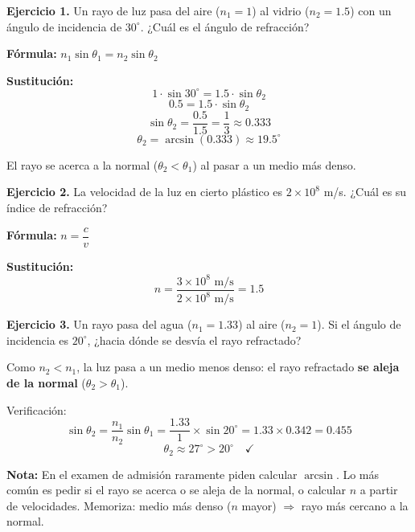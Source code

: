\begin{seccion}

\textbf{Ejercicio 1.} Un rayo de luz pasa del aire ($n_1 = 1$) al vidrio ($n_2 = 1.5$) con un ángulo de incidencia de $30^\circ$. ¿Cuál es el ángulo de refracción?

\begin{ecuacion}
\textbf{Fórmula:} $n_1 \sin\theta_1 = n_2 \sin\theta_2$

\textbf{Sustitución:}
$$1 \cdot \sin 30^\circ = 1.5 \cdot \sin\theta_2$$
$$0.5 = 1.5 \cdot \sin\theta_2$$
$$\sin\theta_2 = \frac{0.5}{1.5} = \frac{1}{3} \approx 0.333$$
$$\theta_2 = \arcsin(0.333) \approx 19.5^\circ$$

El rayo se acerca a la normal ($\theta_2 < \theta_1$) al pasar a un medio más denso.
\end{ecuacion}

\vspace{0.4cm}

\textbf{Ejercicio 2.} La velocidad de la luz en cierto plástico es $2 \times 10^8$ m/s. ¿Cuál es su índice de refracción?

\begin{ecuacion}
\textbf{Fórmula:} $n = \dfrac{c}{v}$

\textbf{Sustitución:}
$$n = \frac{3 \times 10^8 \text{ m/s}}{2 \times 10^8 \text{ m/s}} = 1.5$$
\end{ecuacion}

\vspace{0.4cm}

\textbf{Ejercicio 3.} Un rayo pasa del agua ($n_1 = 1.33$) al aire ($n_2 = 1$). Si el ángulo de incidencia es $20^\circ$, ¿hacia dónde se desvía el rayo refractado?

\begin{ecuacion}
Como $n_2 < n_1$, la luz pasa a un medio menos denso: el rayo refractado \textbf{se aleja de la normal} ($\theta_2 > \theta_1$).

Verificación:
$$\sin\theta_2 = \frac{n_1}{n_2}\sin\theta_1 = \frac{1.33}{1} \times \sin 20^\circ = 1.33 \times 0.342 = 0.455$$
$$\theta_2 \approx 27^\circ > 20^\circ \quad \checkmark$$
\end{ecuacion}

\begin{nota}
\textbf{Nota:} En el examen de admisión raramente piden calcular $\arcsin$. Lo más común es pedir si el rayo se acerca o se aleja de la normal, o calcular $n$ a partir de velocidades. Memoriza: medio más denso ($n$ mayor) $\Rightarrow$ rayo más cercano a la normal.
\end{nota}

\end{seccion}

